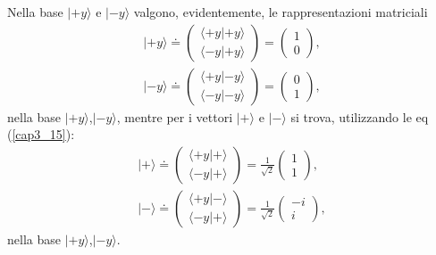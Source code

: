 \documentclass[a4paper,12pt,oneside]{book}
\begin{document}
Nella base $| +y \rangle $ e $| -y \rangle $ valgono, evidentemente, le rappresentazioni matriciali
	\begin{equation}
		\boxed{		
			\begin{array}{c}
			| +y \rangle \doteq 
			\begin{pmatrix}
			\langle +y | +y \rangle\\
			\langle -y | +y \rangle
			\end{pmatrix}=
			\begin{pmatrix}
			1\\
			0
			\end{pmatrix}, \\
			| -y \rangle \doteq 
			\begin{pmatrix}
			\langle +y | -y \rangle\\
			\langle -y | -y \rangle
			\end{pmatrix}=
			\begin{pmatrix}
			0\\
			1
			\end{pmatrix},
			\end{array} 
			}
	\end{equation}
nella base $| +y \rangle $,$| -y \rangle$, mentre per i vettori $| + \rangle $ e $| - \rangle$ si trova, utilizzando le eq (\ref{cap3_15}):
	\begin{equation}
		\boxed{
			\begin{array}{c}
			| + \rangle \doteq 
			\begin{pmatrix}
			\langle +y | + \rangle\\
			\langle -y | + \rangle
			\end{pmatrix}=
			\frac{1}{\sqrt{2}}
			\begin{pmatrix}
			1\\
			1
			\end{pmatrix} ,\\
			| - \rangle \doteq 
			\begin{pmatrix}
			\langle +y | - \rangle\\
			\langle -y | + \rangle
			\end{pmatrix}=
			\frac{1}{\sqrt{2}}
			\begin{pmatrix}
			-i\\
			i
			\end{pmatrix},
			\end{array} 
			}
	\label{cap3_16}
	\end{equation}
nella base $| +y \rangle $,$| -y \rangle$.\\
\end{document}
